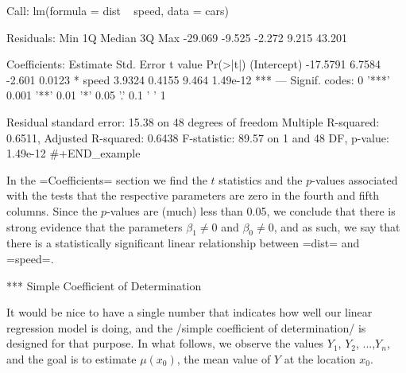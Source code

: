 Call:
lm(formula = dist ~ speed, data = cars)

Residuals:
    Min      1Q  Median      3Q     Max 
-29.069  -9.525  -2.272   9.215  43.201 

Coefficients:
            Estimate Std. Error t value Pr(>|t|)    
(Intercept) -17.5791     6.7584  -2.601   0.0123 *  
speed         3.9324     0.4155   9.464 1.49e-12 ***
---
Signif. codes:  0 '***' 0.001 '**' 0.01 '*' 0.05 '.' 0.1 ' ' 1

Residual standard error: 15.38 on 48 degrees of freedom
Multiple R-squared:  0.6511,	Adjusted R-squared:  0.6438 
F-statistic: 89.57 on 1 and 48 DF,  p-value: 1.49e-12
#+END_example

In the =Coefficients= section we find the \(t\) statistics and the
\(p\)-values associated with the tests that the respective parameters
are zero in the fourth and fifth columns. Since the \(p\)-values are
(much) less than 0.05, we conclude that there is strong evidence that
the parameters \(\beta_{1}\neq0\) and \(\beta_{0}\neq0\), and as such,
we say that there is a statistically significant linear relationship
between =dist= and =speed=.

*** Simple Coefficient of Determination

It would be nice to have a single number that indicates how well our
linear regression model is doing, and the /simple coefficient of
determination/ is designed for that purpose. In what follows, we
observe the values \(Y_{1}\), \(Y_{2}\), ...,\(Y_{n}\), and the goal
is to estimate \(\mu(x_{0})\), the mean value of \(Y\) at the location
\(x_{0}\).

